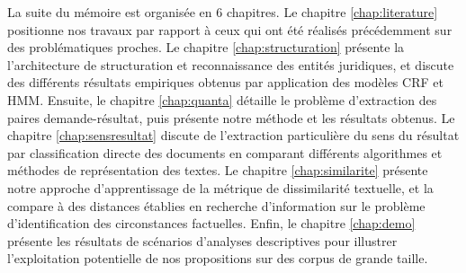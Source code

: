La suite du mémoire est organisée en 6 chapitres. Le chapitre \ref{chap:literature} positionne nos travaux par rapport à ceux qui ont été réalisés précédemment sur des problématiques proches. Le chapitre \ref{chap:structuration} présente la l'architecture de structuration et reconnaissance des entités juridiques, et discute des différents résultats empiriques obtenus par application des modèles CRF et HMM. Ensuite, le chapitre \ref{chap:quanta} détaille le problème  d'extraction des paires demande-résultat, puis présente  notre méthode et les résultats obtenus. Le chapitre \ref{chap:sensresultat} discute de l'extraction particulière du sens du résultat par classification directe des documents en comparant différents algorithmes et méthodes de représentation des textes. Le chapitre \ref{chap:similarite} présente notre approche d'apprentissage de la métrique de dissimilarité textuelle, et la compare à des distances établies en recherche d'information sur le problème d'identification des circonstances factuelles. Enfin, le chapitre \ref{chap:demo} présente les résultats de scénarios d'analyses descriptives pour illustrer l'exploitation potentielle de nos propositions sur des corpus de grande taille. 
